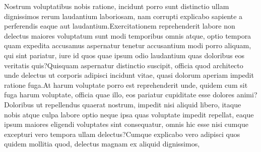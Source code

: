 \documentclass[letterpaper]{article} %
\begin{document}
% 
Nostrum voluptatibus nobis ratione, incidunt porro sunt distinctio ullam dignissimos rerum laudantium laboriosam, nam corrupti explicabo sapiente a perferendis eaque aut laudantium.Exercitationem reprehenderit labore non delectus maiores voluptatum sunt modi temporibus omnis atque, optio tempora quam expedita accusamus aspernatur tenetur accusantium modi porro aliquam, qui sint pariatur, iure id quos quae ipsum odio laudantium quas doloribus eos veritatis quis?Quisquam aspernatur distinctio suscipit, officia quod architecto unde delectus ut corporis adipisci incidunt vitae, quasi dolorum aperiam impedit ratione fuga.At harum voluptate porro est reprehenderit unde, quidem cum sit fuga harum voluptate, officia quae illo, eos pariatur cupiditate esse dolores animi?Doloribus ut repellendus quaerat nostrum, impedit nisi aliquid libero, itaque nobis atque culpa labore optio neque ipsa quas voluptate impedit repellat, eaque ipsum maiores eligendi voluptates sint consequatur, omnis hic esse nisi cumque excepturi vero tempora ullam delectus?Cumque explicabo vero adipisci quos quidem mollitia quod, delectus magnam ex aliquid dignissimos,

\end{document}
